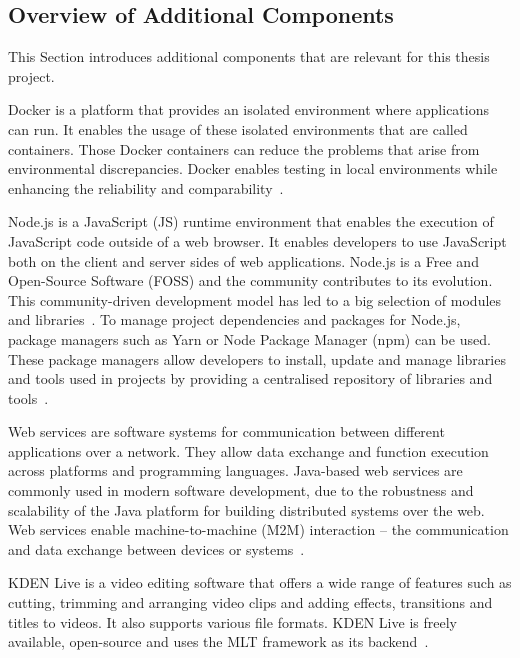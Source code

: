 \documentclass[../MasterThesis.tex]{subfiles}
\begin{document}
\subsection{Overview of Additional Components}
\label{subsection:overview_additional_components}


This Section introduces additional components that are relevant for this thesis project.


Docker is a platform that provides an isolated environment where applications can run. It enables the usage of these isolated environments that are called containers.
Those Docker containers can reduce the problems that arise from environmental discrepancies. Docker enables testing in local environments while enhancing the reliability and comparability~\cite{docker}.



Node.js is a JavaScript (JS) runtime environment that enables the execution of JavaScript code outside of a web browser.
It enables developers to use JavaScript both on the client and server sides of web applications. 
Node.js is a Free and Open-Source Software (FOSS) and the community contributes to its evolution. This community-driven development model has led to a big selection of modules and libraries~\cite{nodejs, RM_Frontend, ap3_docs}.
%
To manage project dependencies and packages for Node.js, package managers such as Yarn or Node Package Manager (npm) can be used. These package managers allow developers to install, update and manage libraries and tools used in projects by providing a centralised repository of libraries and tools~\cite{RM_Frontend, npmyarn}.



Web services are software systems for communication between different applications over a network. 
They allow data exchange and function execution across platforms and programming languages. 
Java-based web services are commonly used in modern software development, due to the robustness and scalability of the Java platform for building distributed systems over the web.
Web services enable machine-to-machine (M2M) interaction -- the communication and data exchange between devices or systems~\cite{webservice}.

KDEN Live is a video editing software that offers a wide range of features such as cutting, trimming and arranging video clips and adding effects, transitions and titles to videos. It also supports various file formats. KDEN Live is freely available, open-source and uses the MLT framework as its backend~\cite{kdenlive}.
\end{document}
